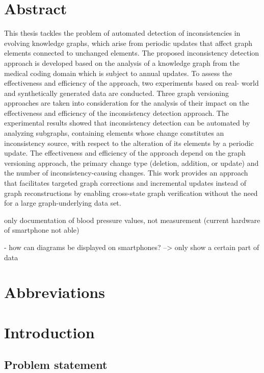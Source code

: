 



\chapter{Abstract}\label{abstract}

This thesis tackles the problem of automated detection of inconsistencies in evolving knowledge graphs, which arise from periodic updates that affect graph elements connected to unchanged elements.
The proposed inconsistency detection approach is developed based on the analysis of a knowledge graph from the medical coding domain which is subject to annual updates. To assess the effectiveness and efficiency of the approach, two experiments based on real- world and synthetically generated data are conducted. Three graph versioning approaches are taken into consideration for the analysis of their impact on the effectiveness and efficiency of the inconsistency detection approach. The experimental results showed that inconsistency detection can be automated by analyzing subgraphs, containing elements whose change constitutes an inconsistency source, with respect to the alteration of its elements by a periodic update. The effectiveness and efficiency of the approach depend on the graph versioning approach, the primary change type (deletion, addition, or update) and the number of inconsistency-causing changes.
This work provides an approach that facilitates targeted graph corrections and incremental updates instead of graph reconstructions by enabling cross-state graph verification without the need for a large graph-underlying data set.

only documentation of blood pressure values, not measurement (current hardware of smartphone not able)

- how can diagrams be displayed on smartphones? --> only show a certain part of data

\chapter{Abbreviations}


\chapter{Introduction}\label{introduction}

\section{Problem statement}
